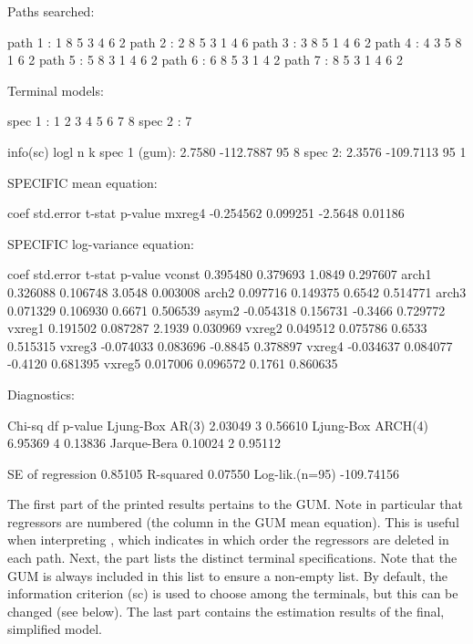 \documentclass[article,nojss]{jss}
\begin{document}
\begin{CodeChunk}
\begin{CodeOutput}
Paths searched: 

path 1 : 1 8 5 3 4 6 2 
path 2 : 2 8 5 3 1 4 6 
path 3 : 3 8 5 1 4 6 2 
path 4 : 4 3 5 8 1 6 2 
path 5 : 5 8 3 1 4 6 2 
path 6 : 6 8 5 3 1 4 2 
path 7 : 8 5 3 1 4 6 2 

Terminal models: 

spec 1 : 1 2 3 4 5 6 7 8 
spec 2 : 7 

               info(sc)      logl  n  k
spec 1 (gum):    2.7580 -112.7887 95  8
spec 2:          2.3576 -109.7113 95  1

SPECIFIC mean equation:

            coef std.error  t-stat p-value
mxreg4 -0.254562  0.099251 -2.5648 0.01186

SPECIFIC log-variance equation:

            coef std.error  t-stat  p-value
vconst  0.395480  0.379693  1.0849 0.297607
arch1   0.326088  0.106748  3.0548 0.003008
arch2   0.097716  0.149375  0.6542 0.514771
arch3   0.071329  0.106930  0.6671 0.506539
asym2  -0.054318  0.156731 -0.3466 0.729772
vxreg1  0.191502  0.087287  2.1939 0.030969
vxreg2  0.049512  0.075786  0.6533 0.515315
vxreg3 -0.074033  0.083696 -0.8845 0.378897
vxreg4 -0.034637  0.084077 -0.4120 0.681395
vxreg5  0.017006  0.096572  0.1761 0.860635

Diagnostics:

                   Chi-sq df p-value
Ljung-Box AR(3)   2.03049  3 0.56610
Ljung-Box ARCH(4) 6.95369  4 0.13836
Jarque-Bera       0.10024  2 0.95112

SE of regression    0.85105
R-squared           0.07550
Log-lik.(n=95)   -109.74156
\end{CodeOutput}
\end{CodeChunk}
%
The first part of the printed results pertains to the GUM. Note in
particular that regressors are numbered (the  column in the
GUM mean equation). This is useful when interpreting , which indicates in which order the regressors are deleted
in each path. Next, the  part lists the distinct
terminal specifications. Note that the GUM is always included in this
list to ensure a non-empty list. By default, the \cite{Schwarz1978}
information criterion (sc) is used to choose among the terminals, but
this can be changed (see below). The last part contains the estimation
results of the final, simplified model.
\end{document}
